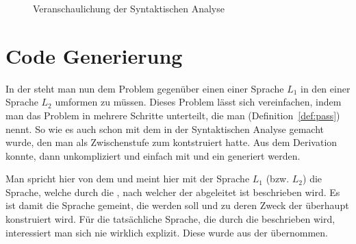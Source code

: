 \pagebreak
\begin{figure}[H]
  \centering
  \hfill
  \vspace{2cm}

  \caption{Veranschaulichung der Syntaktischen Analyse}
  \label{fig:syntaktische_analyse_veranschaulichung}
\end{figure}

\section{Code Generierung}
\label{sec:code_generierung}

In der  steht man nun dem Problem gegenüber einen  einer Sprache $L_1$ in den  einer Sprache $L_2$ umformen zu müssen. Dieses Problem lässt sich vereinfachen, indem man das Problem in mehrere Schritte unterteilt, die man  (Definition~\ref{def:pass}) nennt. So wie es auch schon mit dem  in der Syntaktischen Analyse gemacht wurde, den man als Zwischenstufe zum  kontstruiert hatte. Aus dem Derivation konnte, dann unkompliziert und einfach mit  und  ein  generiert werden.

\begin{Special_Paragraph}
  Man spricht hier von dem  und meint hier mit der Sprache $L_1$ (bzw. $L_2$)  die Sprache, welche durch die , nach welcher der  abgeleitet ist beschrieben wird. Es ist damit  die Sprache gemeint, die  werden soll und zu deren Zweck der  überhaupt konstruiert wird. Für die tatsächliche Sprache, die durch die  beschrieben wird, interessiert man sich nie wirklich explizit. Diese  wurde aus der  \cite{g_siek_course_2022} übernommen.
\end{Special_Paragraph}

